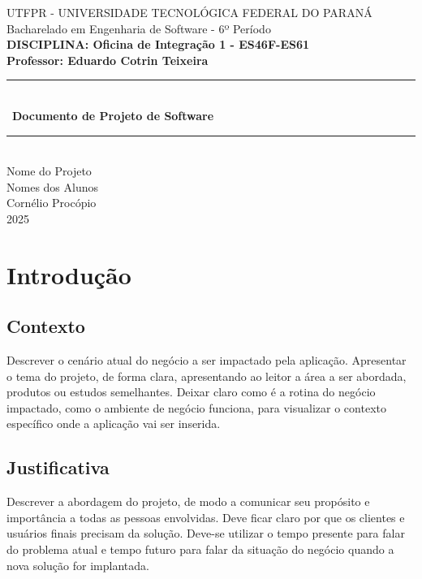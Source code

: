 \documentclass[a4paper,12pt]{article}
\begin{document}
\begin{titlepage}
    \centering
    {\Large UTFPR - UNIVERSIDADE TECNOLÓGICA FEDERAL DO PARANÁ} \\
    \vspace{0.5cm}
    {\large Bacharelado em Engenharia de Software - 6º Período} \\
    \vspace{1cm}
    {\bf DISCIPLINA: Oficina de Integração 1 - ES46F-ES61} \\
    \vspace{0.5cm}
    {\bf Professor: Eduardo Cotrin Teixeira} \\
    \vfill
    \rule{\linewidth}{1.5pt} \\
        \vspace{0.5cm} \
    {\Huge \textbf{Documento de Projeto de Software}} \\
    \rule{\linewidth}{1.5pt} \\
    \vspace{1cm}
    {\Large Nome do Projeto} \\
    \vfill
    {\large Nomes dos Alunos} \\
    \vspace{1cm}
    {\large Cornélio Procópio} \\
    {\large 2025} \\
\end{titlepage}


\tableofcontents
\newpage


\section{Introdução}
\subsection{Contexto}
Descrever o cenário atual do negócio a ser impactado pela aplicação. Apresentar o tema do projeto, de forma clara, apresentando ao leitor a área a ser abordada, produtos ou estudos semelhantes. Deixar claro como é a rotina do negócio impactado, como o ambiente de negócio funciona, para visualizar o contexto específico onde a aplicação vai ser inserida.

\subsection{Justificativa}
Descrever a abordagem do projeto, de modo a comunicar seu propósito e importância a todas as pessoas envolvidas. Deve ficar claro por que os clientes e usuários finais precisam da solução. Deve-se utilizar o tempo presente para falar do problema atual e tempo futuro para falar da situação do negócio quando a nova solução for implantada.
\end{document}
